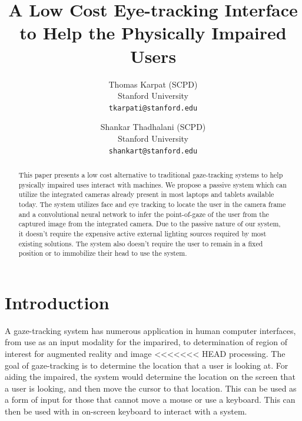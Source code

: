 \documentclass[10pt,twocolumn,letterpaper]{article}
\begin{document}
\title{A Low Cost Eye-tracking Interface to Help the Physically
  Impaired Users}

\author{Thomas Karpat (SCPD)\\
Stanford University \\
{\tt\small tkarpati@stanford.edu}
\and
Shankar Thadhalani (SCPD)\\
Stanford University \\
{\tt\small shankart@stanford.edu}
}

\maketitle

\begin{abstract}
This paper presents a low cost alternative to traditional
gaze-tracking systems to help pysically impaired uses interact with
machines. We propose a passive system which can utilize the integrated
cameras already present in most laptops and tablets available
today. The system utilizes face and eye tracking to locate the user in
the camera frame and a convolutional neural network to infer the
point-of-gaze of the user from the captured image from the integrated
camera. Due to the passive nature of our system, it doesn't require
the expensive active external lighting sources required by most
existing solutions. The system also doesn't require the user to remain
in a fixed position or to immobilize their head to use the system.
\end{abstract}

\section{Introduction}
A gaze-tracking system has numerous application in human computer
interfaces, from use as an input modality for the imparired\cite{calvo}, to
determination of region of interest for augmented reality and image
<<<<<<< HEAD
processing. The goal of gaze-tracking is to determine the location
that a user is looking at. For aiding the impaired, the system would
determine the location on the screen that a user is looking, and then
move the cursor to that location. This can be used as a form of input
for those that cannot move a mouse or use a keyboard. This
can then be used with in on-screen keyboard to interact with a
system.
\end{document}
